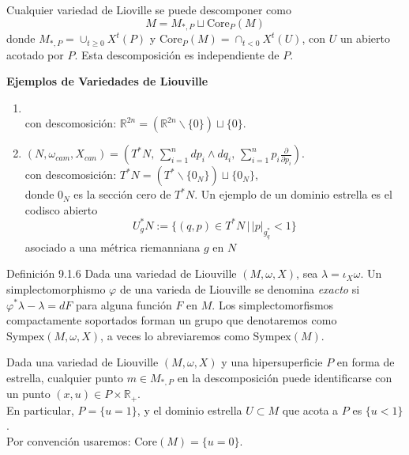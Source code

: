\documentclass{beamer}
\begin{document}
\begin{frame}{}{}
Cualquier variedad de Lioville se puede descomponer como
$$M= M_{\ast,P}\sqcup \mbox{Core}_P(M)$$
donde $M_{\ast,P}=\cup_{t\geq 0}X^t(P)$ y $\mbox{Core}_P(M)= \cap_{t< 0} X^t(U)$, con $U$ un abierto acotado por $P$. Esta descomposici\'on es independiente de $P$.

\begin{block}{{\bfseries Ejemplos de Variedades de Liouville}}
\begin{enumerate}
\item {}\\
$\, $\\con descomosici\'on: $\mathbb{R}^{2n}=(\mathbb{R}^{2n}\backslash \{0\})\sqcup \{0\}$.

\item $(N,\omega_{cam},X_{can})=\left( T^\ast N,\,\sum_{i=1}^{n} dp_i\wedge dq_i,\, \sum_{i=1}^{n} p_i\frac{\partial}{\partial p_i} \right)$.\\
$\, $\\con descomosici\'on: $T^{\ast}N=(T^{\ast}\backslash \{0_N\})\sqcup \{0_N\}$,
$\, $\\
donde $0_N$ es la secci\'on cero de $T^\ast N$. Un ejemplo de un dominio estrella es el codisco abierto 
$$U^{\ast}_{g}N:=\{(q,p)\in T^\ast N \,|\, |p|_{g_{q}^{\ast}}<1\}$$
asociado a una m\'etrica riemanniana $g$  en $N$
\end{enumerate}
\end{block}
\end{frame}


\begin{frame}
\begin{block}{Definici\'on 9.1.6}
Dada una variedad de Liouville $(M, \omega, X)$, sea $\lambda =\iota_X\omega$. Un simplectomorphismo $\varphi$ de una varieda de Liouville se denomina \emph{exacto} si $\varphi^{\ast}\lambda -\lambda =dF$ para alguna funci\'on $F$ en $M$. Los simplectomorfismos compactamente soportados forman un grupo que denotaremos como $\mbox{Sympex}(M, \omega, X)$, a veces lo abreviaremos como  $\mbox{Sympex}(M)$.
\end{block}
\end{frame}

\begin{frame}
Dada una variedad de Liouville $(M,\omega,X)$ y una hipersuperficie $P$ en forma de estrella, cualquier punto $m\in M_{\ast,P}$ en la descomposici\'on puede identificarse con un punto $(x,u)\in P\times \mathbb{R}_{+}$. \\
$\,$\\
En particular, $P=\{u=1\}$, y el dominio estrella $U\subset M$ que acota a $P$ es $\{u<1\}$.\\
$\,$\\
Por convenci\'on usaremos: $\mbox{Core}(M)=\{u=0\}$.
\end{frame}
\end{document}
